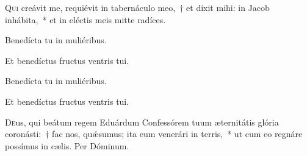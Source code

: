 \documentclass[vesperale_romanum.tex]{subfiles}
\begin{document}



\lettrine{Q}{ui} creávit me, requiévit in tabernáculo meo,~† et dixit mihi: in Jacob inhábita,~* et in eléctis meis mitte radíces.


\vv Benedícta tu in muliéribus.

\rr Et benedíctus fru\-ctus ventris tui.

\admagnificat



\oratio






\vv Benedícta tu in muliéribus.

\rr Et benedíctus fru\-ctus ventris tui.

\admagnificat


\myrule


\semiduplexmtv

\oratio

\lettrine{D}{e}us, qui beátum regem Eduárdum Confessórem tuum æternitátis glória coronásti:~† fac nos, quǽsumus; ita eum venerári in terris,~* ut cum eo regnáre possímus in cælis. Per Dóminum.

\vespsequentiscomm

\myrule

\newpage


\duplex
\end{document}

